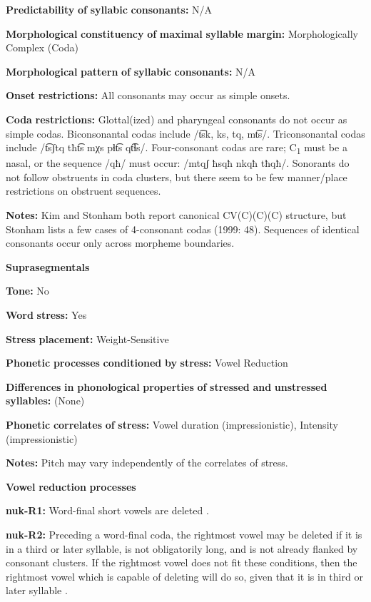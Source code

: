 \begin{styleBody}
\textbf{Predictability} \textbf{of} \textbf{syllabic} \textbf{consonants:} N/A

\textbf{Morphological} \textbf{constituency} \textbf{of} \textbf{maximal} \textbf{syllable} \textbf{margin:} Morphologically Complex (Coda)

\textbf{Morphological} \textbf{pattern} \textbf{of} \textbf{syllabic} \textbf{consonants:} N/A

\textbf{Onset} \textbf{restrictions:} All consonants may occur as simple onsets.

\textbf{Coda} \textbf{restrictions:} Glottal(ized) and pharyngeal consonants do not occur as simple codas. Biconsonantal codas include /t͡sk, ks, tq, mt͡s/. Triconsonantal codas include /t͡sʃtq tħt͡s mχs pɬt͡s qt͡ɬs/. Four-consonant codas are rare; C\textsubscript{1} must be a nasal, or the sequence /qħ/ must occur: /mtqʃ ħsqħ nkqħ tħqħ/. Sonorants do not follow obstruents in coda clusters, but there seem to be few manner/place restrictions on obstruent sequences.

\textbf{Notes:} Kim and Stonham both report canonical CV(C)(C)(C) structure, but Stonham lists a few cases of 4-consonant codas (1999: 48). Sequences of identical consonants occur only across morpheme boundaries.

\textbf{Suprasegmentals}

\textbf{Tone:} No

\textbf{Word} \textbf{stress:} Yes

\textbf{Stress} \textbf{placement:} Weight-Sensitive

\textbf{Phonetic} \textbf{processes} \textbf{conditioned} \textbf{by} \textbf{stress:} Vowel Reduction

\textbf{Differences} \textbf{in} \textbf{phonological} \textbf{properties} \textbf{of} \textbf{stressed} \textbf{and} \textbf{unstressed} \textbf{syllables:} (None)

\textbf{Phonetic} \textbf{correlates} \textbf{of} \textbf{stress:} Vowel duration (impressionistic), Intensity (impressionistic)

\textbf{Notes:} Pitch may vary independently of the correlates of stress.

\textbf{Vowel} \textbf{reduction} \textbf{processes}

\textbf{nuk-R1:} Word-final short vowels are deleted \citep[25]{Rose1981}.

\textbf{nuk-R2:} Preceding a word-final coda, the rightmost vowel may be deleted if it is in a third or later syllable, is not obligatorily long, and is not already flanked by consonant clusters. If the rightmost vowel does not fit these conditions, then the rightmost vowel which is capable of deleting will do so, given that it is in third or later syllable \citep[25]{Rose1981}.


\end{styleBody}
